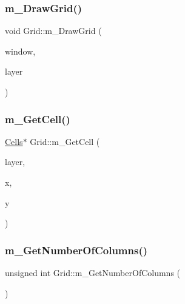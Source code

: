 \subsubsection{\texorpdfstring{m\+\_\+\+Draw\+Grid()}{m\_DrawGrid()}}
{\footnotesize\ttfamily void Grid\+::m\+\_\+\+Draw\+Grid (\begin{DoxyParamCaption}\item[{sf\+::\+Render\+Window \&}]{window,  }\item[{unsigned int}]{layer }\end{DoxyParamCaption})}

\mbox{\label{class_grid_a12c587d1708736010999fa4e1e7601e0}} 
\subsubsection{\texorpdfstring{m\+\_\+\+Get\+Cell()}{m\_GetCell()}}
{\footnotesize\ttfamily \mbox{\hyperlink{class_cells}{Cells}}$\ast$ Grid\+::m\+\_\+\+Get\+Cell (\begin{DoxyParamCaption}\item[{int}]{layer,  }\item[{int}]{x,  }\item[{int}]{y }\end{DoxyParamCaption})}

\mbox{\label{class_grid_af11836b4b3d9fb8d5fe9da6bfae9a951}} 
\subsubsection{\texorpdfstring{m\+\_\+\+Get\+Number\+Of\+Columns()}{m\_GetNumberOfColumns()}}
{\footnotesize\ttfamily unsigned int Grid\+::m\+\_\+\+Get\+Number\+Of\+Columns (\begin{DoxyParamCaption}{ }\end{DoxyParamCaption})}

\mbox{\label{class_grid_a4a783e0c327cf99e7e831e511ce07847}} 
